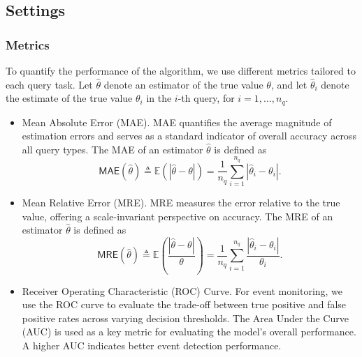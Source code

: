 \documentclass[acmsmall]{acmart}
\newcommand{\E}{\mathbb{E}}
\begin{document}







\subsection{Settings}

\subsubsection{Metrics}

To quantify the performance of the algorithm, we use different metrics tailored
to each query task.
Let $\hat\theta$ denote an estimator of the true value $\theta$, and let
$\hat\theta_i$ denote the estimate of the true value $\theta_i$ in the $i$-th query,
for $i=1,\ldots,n_q$.
\begin{itemize}
    \item {Mean Absolute Error (MAE)}.
MAE quantifies the average magnitude of estimation errors and serves as a
standard indicator of overall accuracy across all query types.
The MAE of an estimator $\hat\theta$ is defined as
\[
  \mathsf{MAE}(\hat\theta)
  \triangleq \E(|\hat\theta - \theta |)
  = \frac{1}{n_q}\sum_{i=1}^{n_q} |\hat\theta_i - \theta_i |.
\]
    \item {Mean Relative Error (MRE)}.
MRE measures the error relative to the true value, offering
a scale-invariant perspective on accuracy.
The MRE of an estimator $\hat\theta$ is defined as
\[
  \mathsf{MRE}(\hat\theta)
  \triangleq \E(\frac{|\hat\theta - \theta |}{\theta})
  = \frac{1}{n_q}\sum_{i=1}^{n_q}\frac{|\hat\theta_i - \theta_i|}{\theta_i}.
\]
    \item {Receiver Operating Characteristic (ROC) Curve}.
For event monitoring, we use the ROC curve to evaluate the trade-off between
true positive and false positive rates across varying decision thresholds.
The Area Under the Curve (AUC) is used as a key metric for evaluating the
model's overall performance.
A higher AUC indicates better event detection performance.
\end{itemize}
\end{document}
